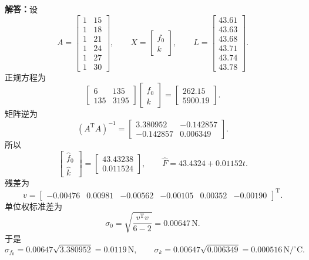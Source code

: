 \documentclass[UTF8,zihao=-4]{ctexart}
\newcommand{\jieda}{\noindent\textbf{解答：}}
\begin{document}
{\jieda 设
\begin{equation*}
    A=\begin{bmatrix}1&15\\1&18\\1&21\\1&24\\1&27\\1&30\end{bmatrix},
    \qquad
    X=\begin{bmatrix}f_0\\k\end{bmatrix},
    \qquad
    L=\begin{bmatrix}43.61\\43.63\\43.68\\43.71\\43.74\\43.78\end{bmatrix}.
\end{equation*}
正规方程为
\begin{equation*}
    \begin{bmatrix}6&135\\135&3195\end{bmatrix}
    \begin{bmatrix}f_0\\k\end{bmatrix}
    =
    \begin{bmatrix}262.15\\5900.19\end{bmatrix}.
\end{equation*}
矩阵逆为
\begin{equation*}
    (A^{\mathrm T}A)^{-1}=\begin{bmatrix}
        3.380952&-0.142857\\
        -0.142857&0.006349
    \end{bmatrix}.
\end{equation*}
所以
\begin{equation*}
    \begin{bmatrix}\hat f_0\\\hat k\end{bmatrix}
    =\begin{bmatrix}43.43238\\0.011524\end{bmatrix},
    \qquad
    \hat{F}=43.4324+0.01152t.
\end{equation*}
残差为
\begin{equation*}
    v=\begin{bmatrix}-0.00476&0.00981&-0.00562&-0.00105&0.00352&-0.00190\end{bmatrix}^{\mathrm T}.
\end{equation*}
单位权标准差为
\begin{equation*}
    \sigma_0=\sqrt{\frac{v^{\mathrm T}v}{6-2}}=0.00647\,\mathrm{N}.
\end{equation*}
于是
\begin{equation*}
    \sigma_{f_0}=0.00647\sqrt{3.380952}=0.0119\,\mathrm{N},
    \qquad
    \sigma_k=0.00647\sqrt{0.006349}=0.000516\,\mathrm{N}/{}^\circ\mathrm{C}.
\end{equation*}

}
\end{document}
